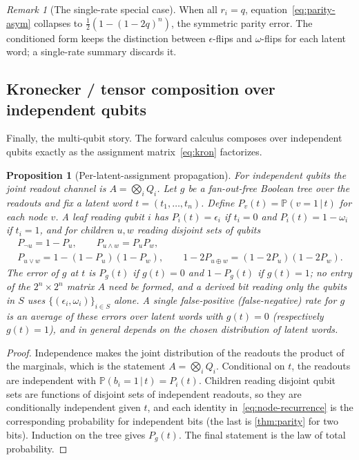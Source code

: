 \documentclass[11pt]{article}
\numberwithin{equation}{section}
\theoremstyle{plain}
\newtheorem{proposition}[theorem]{Proposition}
\theoremstyle{definition}
\theoremstyle{remark}
\newtheorem{remark}[theorem]{Remark}
\newcommand{\eps}{\epsilon}
\newcommand{\Prob}{\mathbb{P}}
\newcommand{\given}{\,\vert\,}
\begin{document}
\begin{remark}[The single-rate special case]
When all $r_i=q$, equation~\eqref{eq:parity-asym} collapses to
$\tfrac12(1-(1-2q)^n)$, the symmetric parity error. The conditioned form keeps
the distinction between $\eps$-flips and $\omega$-flips for each latent word;
a single-rate summary discards it.
\end{remark}

\subsection{Kronecker / tensor composition over independent qubits}

Finally, the multi-qubit story. The forward calculus composes over independent
qubits exactly as the assignment matrix~\eqref{eq:kron} factorizes.

\begin{proposition}[Per-latent-assignment propagation]
\label{prop:tensor}
For independent qubits the joint readout channel is $A=\bigotimes_i Q_i$. Let
$g$ be a fan-out-free Boolean tree over the readouts and fix a latent word
$t=(t_1,\dots,t_n)$. Define $P_v(t)=\Prob(v=1\given t)$ for each node $v$. A
leaf reading qubit $i$ has $P_i(t)=\eps_i$ if $t_i=0$ and $P_i(t)=1-\omega_i$
if $t_i=1$, and for children $u,w$ reading disjoint sets of qubits
\begin{equation}
\label{eq:node-recurrence}
  \begin{gathered}
  P_{\lnot u}=1-P_u,\qquad
  P_{u\wedge w}=P_uP_w,\\
  P_{u\vee w}=1-(1-P_u)(1-P_w),\qquad
  1-2P_{u\oplus w}=(1-2P_u)(1-2P_w).
  \end{gathered}
\end{equation}
The error of $g$ at $t$ is $P_g(t)$ if $g(t)=0$ and $1-P_g(t)$ if $g(t)=1$; no
entry of the $2^n\times2^n$ matrix $A$ need be formed, and a derived bit
reading only the qubits in $S$ uses $\{(\eps_i,\omega_i)\}_{i\in S}$ alone. A
single false-positive (false-negative) rate for $g$ is an average of these
errors over latent words with $g(t)=0$ (respectively $g(t)=1$), and in general
depends on the chosen distribution of latent words.
\end{proposition}

\begin{proof}
Independence makes the joint distribution of the readouts the product of the
marginals, which is the statement $A=\bigotimes_i Q_i$. Conditional on $t$, the
readouts are independent with $\Prob(b_i=1\given t)=P_i(t)$. Children reading
disjoint qubit sets are functions of disjoint sets of independent readouts, so
they are conditionally independent given $t$, and each identity
in~\eqref{eq:node-recurrence} is the corresponding probability for independent
bits (the last is \cref{thm:parity} for two bits). Induction on the tree gives
$P_g(t)$. The final statement is the law of total probability.
\end{proof}
\end{document}

